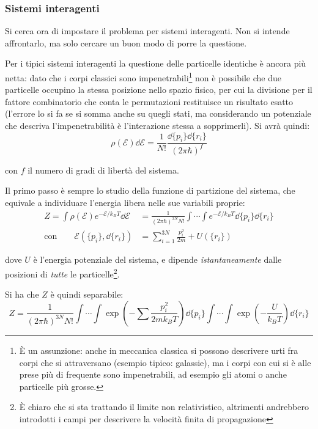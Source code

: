 \subsubsection{Sistemi interagenti}
Si cerca ora di impostare il problema per sistemi interagenti. Non si intende affrontarlo, ma solo cercare un buon modo di porre la questione.
\newline

Per i tipici sistemi interagenti la questione delle particelle identiche è ancora più netta: dato che i corpi classici sono impenetrabili\footnote{\`E un assunzione: anche in meccanica classica si possono descrivere urti fra corpi che si attraversano (esempio tipico: galassie), ma i corpi con cui si è alle prese più di frequente sono impenetrabili, ad esempio gli atomi o anche particelle più grosse.} non è possibile che due particelle occupino la stessa posizione nello spazio fisico, per cui la divisione per il fattore combinatorio che conta le permutazioni restituisce un risultato esatto (l'errore lo si fa se si somma anche su quegli stati, ma considerando un potenziale che descriva l'impenetrabilità è l'interazione stessa a sopprimerli). Si avrà quindi:
\begin{equation*}
\rho(\mathcal{E}) \dd \mathcal{E} = \frac{1}{N!} \frac{\dd\{p_i\} \dd \{ r_i\}}{(2\pi \hbar)^f}
\end{equation*}

\noindent con $f$ il numero di gradi di libertà del sistema.

Il primo passo è sempre lo studio della funzione di partizione del sistema, che equivale a individuare l'energia libera nelle sue variabili proprie:
\begin{align*}
	Z = \int \rho(\mathcal{E}) e^{-\mathcal{E}/k_B T} \dd \mathcal{E} &= \frac{1}{(2\pi \hbar)^{3N} N!}\int \cdots \int e^{-\mathcal{E}/k_B T} \dd\{p_i\} \dd \{ r_i\}\\
	\text{con}\qquad\mathcal{E}(\{p_i\}, \dd \{ r_i\}) &= \sum_{i =1}^{3N} \frac{p_i^2}{2m} + U(\{r_i\})
\end{align*}

\noindent dove $U$ è l'energia potenziale del sistema, e dipende \textit{istantaneamente} dalle posizioni di \textit{tutte} le particelle\footnote{\`E chiaro che si sta trattando il limite non relativistico, altrimenti andrebbero introdotti i campi per descrivere la velocità finita di propagazione}.

Si ha che $Z$ è quindi separabile:
\begin{equation*}
Z = \frac{1}{(2\pi \hbar)^{3N} N!}\int \cdots \int \exp \left(- \sum \frac{p_i^2}{2 m k_B T}\right) \dd\{p_i\} \int \cdots \int \exp \left( - \frac{U}{k_B T}\right) \dd \{ r_i\}
\end{equation*}

